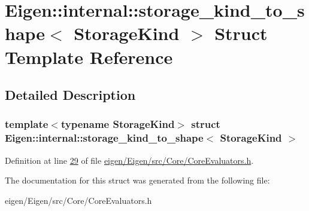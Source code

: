 \hypertarget{struct_eigen_1_1internal_1_1storage__kind__to__shape}{}\section{Eigen\+:\+:internal\+:\+:storage\+\_\+kind\+\_\+to\+\_\+shape$<$ Storage\+Kind $>$ Struct Template Reference}
\label{struct_eigen_1_1internal_1_1storage__kind__to__shape}


\subsection{Detailed Description}
\subsubsection*{template$<$typename Storage\+Kind$>$\newline
struct Eigen\+::internal\+::storage\+\_\+kind\+\_\+to\+\_\+shape$<$ Storage\+Kind $>$}



Definition at line \hyperlink{eigen_2_eigen_2src_2_core_2_core_evaluators_8h_source_l00029}{29} of file \hyperlink{eigen_2_eigen_2src_2_core_2_core_evaluators_8h_source}{eigen/\+Eigen/src/\+Core/\+Core\+Evaluators.\+h}.



The documentation for this struct was generated from the following file\+:\begin{DoxyCompactItemize}
\item 
eigen/\+Eigen/src/\+Core/\+Core\+Evaluators.\+h\end{DoxyCompactItemize}
